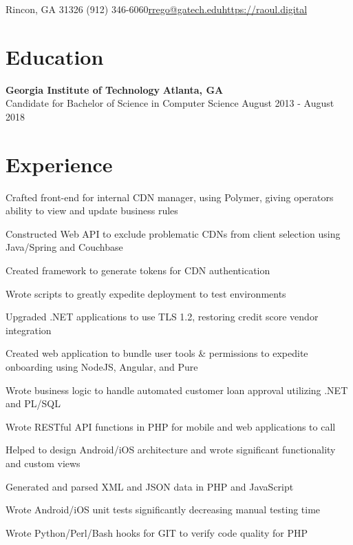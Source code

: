 \documentclass[line]{resume}
\begin{document}
\begin{center}
	 {Rincon, GA 31326} {(912) 346-6060}{\href{mailto:rrego@gatech.edu}{rrego@gatech.edu}}{\href{https://raoul.digital}{https://raoul.digital}}
\end{center}
\section{Education}
\textbf{Georgia Institute of Technology} \hfill \textbf{Atlanta, GA} \\
Candidate for Bachelor of Science in Computer Science  \hfill August 2013 - August 2018
\section{Experience}
\begin{myitemize}
	\item Crafted front-end for internal CDN manager, using Polymer, giving operators ability to view and update business rules
	\item Constructed Web API to exclude problematic CDNs from client selection using Java/Spring and Couchbase
	\item Created framework to generate tokens for CDN authentication
\end{myitemize}

\begin{myitemize}
	\item Wrote scripts to greatly expedite deployment to test environments
	\item Upgraded .NET applications to use TLS 1.2, restoring credit score vendor integration
	\item Created web application to bundle user tools \& permissions to expedite onboarding using NodeJS, Angular, and Pure
	\item Wrote business logic to handle automated customer loan approval utilizing .NET and PL/SQL
\end{myitemize}

\begin{myitemize}
	\item Wrote RESTful API functions in PHP for mobile and web applications to call 
	\item Helped to design Android/iOS architecture and wrote significant functionality and custom views
	\item Generated and parsed XML and JSON data in PHP and JavaScript 
	\item Wrote Android/iOS unit tests significantly decreasing manual testing time 
	\item Wrote Python/Perl/Bash hooks for GIT to verify code quality for PHP
\end{myitemize}
\end{document}
